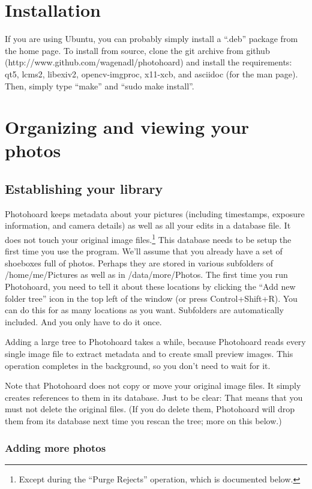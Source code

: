 \documentclass[11pt]{report}
\begin{document}
\chapter{Installation}

If you are using Ubuntu, you can probably simply install a
``.deb'' package from the home page. To install from source, clone the
git archive from github (http://www.github.com/wagenadl/photohoard)
and install the requirements: qt5, lcms2, libexiv2, opencv-imgproc,
x11-xcb, and asciidoc (for the man page). Then, simply type ``make''
and ``sudo make install''.

\chapter{Organizing and viewing your photos}

\section{Establishing your library}
Photohoard keeps metadata about your pictures (including timestamps,
exposure information, and camera details) as well as all your edits in
a database file. It does not touch your original image
files.\footnote{Except during the ``Purge Rejects'' operation, which
  is documented below.} This database needs to be setup the first time
you use the program. We'll assume that you already have a set
of shoeboxes full of photos. Perhaps they are stored in various
subfolders of
/home/me/Pictures as well as in /data/more/Photos. The first time you
run Photohoard, you need to tell it about these locations by clicking
the ``Add new folder tree'' icon in the top left of the window (or
press Control+Shift+R). You can do this for as many locations as you
want. Subfolders are automatically included. And you only have to do
it once.

Adding a large tree to Photohoard takes a while, because Photohoard
reads every single image file to extract metadata and to create small
preview images. This operation completes in the background, so you
don't need to wait for it.

Note that Photohoard does not copy or move your original image
files. It simply creates references to them in its database. Just to
be clear: That means that you must not delete the original files. (If
you do delete them, Photohoard will drop them from its database next
time you rescan the tree; more on this below.)

\subsection{Adding more photos}
\end{document}
